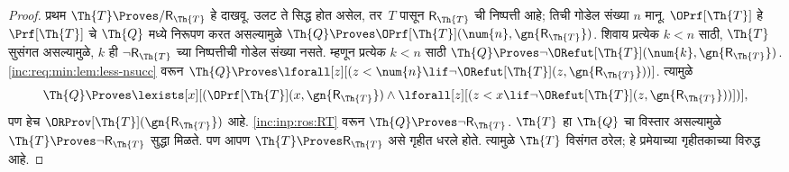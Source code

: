 \begin{proof}
प्रथम $\Th{T} \Proves/
\mathsf{R}_{\Th{T}}$ हे दाखवू.
उलट ते सिद्ध होत असेल,
तर~$T$ पासून
$\mathsf{R}_{\Th{T}}$ ची
निष्पत्ती आहे;
तिची गोडेल संख्या $n$
मानू. $\OPrf[\Th{T}]$
हे $\Prf[\Th{T}]$ चे
$\Th{Q}$ मध्ये निरूपण
करत असल्यामुळे
$\Th{Q} \Proves
\OPrf[\Th{T}](\num{n}, \gn{\mathsf{R}_{\Th{T}}})$.
शिवाय प्रत्येक $k < n$
साठी, $\Th{T}$ सुसंगत
असल्यामुळे, $k$ ही
$\lnot \mathsf{R}_{\Th{T}}$
च्या निष्पत्तीची
गोडेल संख्या नसते.
म्हणून प्रत्येक $k < n$
साठी $\Th{Q} \Proves \lnot
\ORefut[\Th{T}](\num{k}, \gn{\mathsf{R}_{\Th{T}}})$.
\ref{inc:req:min:lem:less-nsucc}
वरून $\Th{Q} \Proves
\lforall[z][(z < \num{n} \lif \lnot \ORefut[\Th{T}](z,
  \gn{\mathsf{R}_{\Th{T}}}))]$.
त्यामुळे
\[\Th{Q} \Proves \lexists[x][(\OPrf[\Th{T}](x,\gn{\mathsf{R}_{\Th{T}}}) \land \lforall[z][(z
    < x \lif \lnot \ORefut[\Th{T}](z,\gn{\mathsf{R}_{\Th{T}}}))])],
\]
पण हेच
$\ORProv[\Th{T}](\gn{\mathsf{R}_{\Th{T}}})$
आहे. \ref{inc:inp:ros:RT} वरून
$\Th{Q}
\Proves \lnot \mathsf{R}_{\Th{T}}$.
$\Th{T}$ हा $\Th{Q}$ चा
विस्तार असल्यामुळे
$\Th{T}
\Proves \lnot \mathsf{R}_{\Th{T}}$
सुद्धा मिळते. पण आपण
$\Th{T} \Proves \mathsf{R}_{\Th{T}}$
असे गृहीत धरले होते.
त्यामुळे $\Th{T}$ विसंगत
ठरेल; हे प्रमेयाच्या
गृहीतकाच्या विरुद्ध आहे.


\end{proof}
